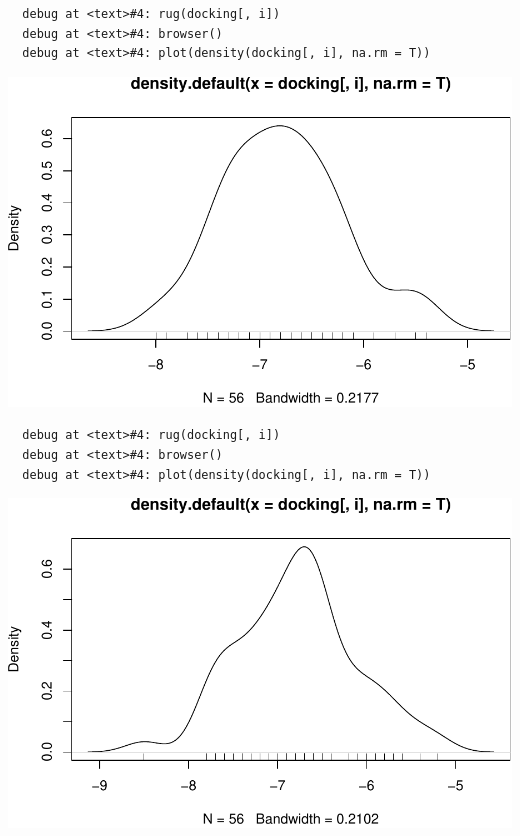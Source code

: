 \documentclass[12pt,twoside]{reedthesis}
\begin{document}
  \begin{verbatim}
  debug at <text>#4: rug(docking[, i])
  debug at <text>#4: browser()
  debug at <text>#4: plot(density(docking[, i], na.rm = T))
  \end{verbatim}
  
  \begin{center}\includegraphics{tesis_files/figure-latex/johan-6} \end{center}
  
  \begin{verbatim}
  debug at <text>#4: rug(docking[, i])
  debug at <text>#4: browser()
  debug at <text>#4: plot(density(docking[, i], na.rm = T))
  \end{verbatim}
  
  \begin{center}\includegraphics{tesis_files/figure-latex/johan-7} \end{center}
  
\end{document}
